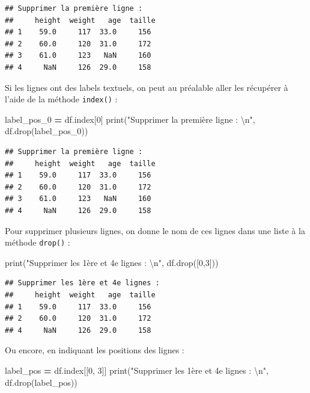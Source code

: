 \documentclass[12pt,]{book}
\newenvironment{Shaded}{\begin{snugshade}}{\end{snugshade}}
\newcommand{\DecValTok}[1]{\textcolor[rgb]{0.00,0.00,0.81}{#1}}
\newcommand{\CharTok}[1]{\textcolor[rgb]{0.31,0.60,0.02}{#1}}
\newcommand{\StringTok}[1]{\textcolor[rgb]{0.31,0.60,0.02}{#1}}
\newcommand{\OperatorTok}[1]{\textcolor[rgb]{0.81,0.36,0.00}{\textbf{#1}}}
\newcommand{\BuiltInTok}[1]{#1}
\newcommand{\NormalTok}[1]{#1}
\numberwithin{equation}{section}
\numberwithin{countremarque}{section}
\begin{document}
\begin{lstlisting}
## Supprimer la première ligne :  
##     height  weight   age  taille
## 1    59.0     117  33.0     156
## 2    60.0     120  31.0     172
## 3    61.0     123   NaN     160
## 4     NaN     126  29.0     158
\end{lstlisting}

Si les lignes ont des labels textuels, on peut au préalable aller les
récupérer à l'aide de la méthode \texttt{index()} :

\begin{Shaded}
\begin{Highlighting}[]
\NormalTok{label_pos_0 }\OperatorTok{=}\NormalTok{ df.index[}\DecValTok{0}\NormalTok{]}
\BuiltInTok{print}\NormalTok{(}\StringTok{"Supprimer la première ligne :  }\CharTok{\textbackslash{}n}\StringTok{"}\NormalTok{, df.drop(label_pos_0))}
\end{Highlighting}
\end{Shaded}

\begin{lstlisting}
## Supprimer la première ligne :  
##     height  weight   age  taille
## 1    59.0     117  33.0     156
## 2    60.0     120  31.0     172
## 3    61.0     123   NaN     160
## 4     NaN     126  29.0     158
\end{lstlisting}

Pour supprimer plusieurs lignes, on donne le nom de ces lignes dans une
liste à la méthode \texttt{drop()} :

\begin{Shaded}
\begin{Highlighting}[]
\BuiltInTok{print}\NormalTok{(}\StringTok{"Supprimer les 1ère et 4e lignes :  }\CharTok{\textbackslash{}n}\StringTok{"}\NormalTok{, df.drop([}\DecValTok{0}\NormalTok{,}\DecValTok{3}\NormalTok{]))}
\end{Highlighting}
\end{Shaded}

\begin{lstlisting}
## Supprimer les 1ère et 4e lignes :  
##     height  weight   age  taille
## 1    59.0     117  33.0     156
## 2    60.0     120  31.0     172
## 4     NaN     126  29.0     158
\end{lstlisting}

Ou encore, en indiquant les positions des lignes :

\begin{Shaded}
\begin{Highlighting}[]
\NormalTok{label_pos }\OperatorTok{=}\NormalTok{ df.index[[}\DecValTok{0}\NormalTok{, }\DecValTok{3}\NormalTok{]]}
\BuiltInTok{print}\NormalTok{(}\StringTok{"Supprimer les 1ère et 4e lignes :  }\CharTok{\textbackslash{}n}\StringTok{"}\NormalTok{, df.drop(label_pos))}
\end{Highlighting}
\end{Shaded}
\end{document}
